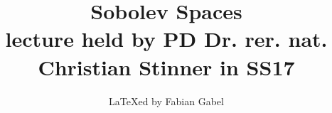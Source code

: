 \documentclass[11pt,a4paper,leqno]{report}
\title{\huge{Sobolev Spaces} \\\small{lecture held by PD Dr. rer. nat. Christian Stinner in SS17}}
\author{\LaTeX ed by Fabian Gabel}
\begin{document}
\maketitle
\tableofcontents









\nocite{*}


\end{document}
